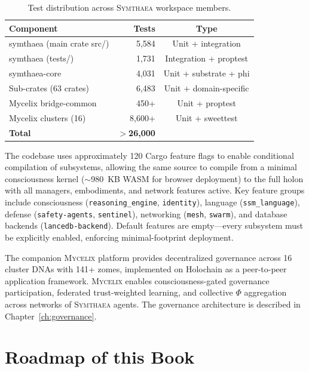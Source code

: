 \documentclass[12pt]{book}
\newcommand{\symthaea}{\textsc{Symthaea}}
\newcommand{\mycelix}{\textsc{Mycelix}}
\begin{document}
\begin{table}[H]
\centering
\caption{Test distribution across \symthaea{} workspace members.}
\label{tab:test-distribution}
\begin{tabular}{lrc}
\toprule
\textbf{Component} & \textbf{Tests} & \textbf{Type} \\
\midrule
symthaea (main crate src/) & 5,584 & Unit + integration \\
symthaea (tests/) & 1,731 & Integration + proptest \\
symthaea-core & 4,031 & Unit + substrate + phi \\
Sub-crates (63 crates) & 6,483 & Unit + domain-specific \\
Mycelix bridge-common & 450+ & Unit + proptest \\
Mycelix clusters (16) & 8,600+ & Unit + sweettest \\
\midrule
\textbf{Total} & \textbf{$>$26,000} & \\
\bottomrule
\end{tabular}
\end{table}

The codebase uses approximately 120 Cargo feature flags to enable conditional compilation of subsystems, allowing the same source to compile from a minimal consciousness kernel ($\sim$980~KB WASM for browser deployment) to the full holon with all managers, embodiments, and network features active. Key feature groups include consciousness (\texttt{reasoning\_engine}, \texttt{identity}), language (\texttt{ssm\_language}), defense (\texttt{safety-agents}, \texttt{sentinel}), networking (\texttt{mesh}, \texttt{swarm}), and database backends (\texttt{lancedb-backend}). Default features are empty---every subsystem must be explicitly enabled, enforcing minimal-footprint deployment.

The companion \mycelix{} platform provides decentralized governance across 16 cluster DNAs with 141+ zomes, implemented on Holochain as a peer-to-peer application framework. \mycelix{} enables consciousness-gated governance participation, federated trust-weighted learning, and collective $\Phi$ aggregation across networks of \symthaea{} agents. The governance architecture is described in Chapter~\ref{ch:governance}.

\section{Roadmap of this Book}
\end{document}
